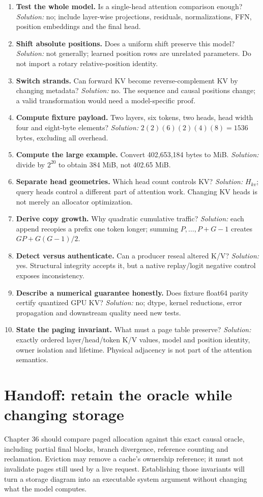 \begin{enumerate}
\emph{Solution:} each of the five internal gaps independently contains a
chunk boundary or not.
\item \textbf{Test the whole model.} Is a single-head attention comparison
enough? \emph{Solution:} no; include layer-wise projections, residuals,
normalizations, FFN, position embeddings and the final head.
\item \textbf{Shift absolute positions.} Does a uniform shift preserve this
model? \emph{Solution:} not generally; learned position rows are unrelated
parameters. Do not import a rotary relative-position identity.
\item \textbf{Switch strands.} Can forward KV become reverse-complement KV
by changing metadata? \emph{Solution:} no. The sequence and causal positions
change; a valid transformation would need a model-specific proof.
\item \textbf{Compute fixture payload.} Two layers, six tokens, two heads,
head width four and eight-byte elements? \emph{Solution:}
$2(2)(6)(2)(4)(8)=1536$ bytes, excluding all overhead.
\item \textbf{Compute the large example.} Convert 402,653,184 bytes to MiB.
\emph{Solution:} divide by $2^{20}$ to obtain 384 MiB, not 402.65 MiB.
\item \textbf{Separate head geometries.} Which head count controls KV?
\emph{Solution:} $H_{kv}$; query heads control a different part of attention
work. Changing KV heads is not merely an allocator optimization.
\item \textbf{Derive copy growth.} Why quadratic cumulative traffic?
\emph{Solution:} each append recopies a prefix one token longer; summing
$P,\ldots,P+G-1$ creates $GP+G(G-1)/2$.
\item \textbf{Detect versus authenticate.} Can a producer reseal altered
K/V? \emph{Solution:} yes. Structural integrity accepts it, but a native
replay/logit negative control exposes inconsistency.
\item \textbf{Describe a numerical guarantee honestly.} Does fixture
float64 parity certify quantized GPU KV? \emph{Solution:} no; dtype,
kernel reductions, error propagation and downstream quality need new tests.
\item \textbf{State the paging invariant.} What must a page table preserve?
\emph{Solution:} exactly ordered layer/head/token K/V values, model and
position identity, owner isolation and lifetime. Physical adjacency is not
part of the attention semantics.
\end{enumerate}

\section{Handoff: retain the oracle while changing storage}
Chapter 36 should compare paged allocation against this exact causal oracle,
including partial final blocks, branch divergence, reference counting and
reclamation. Eviction may remove a cache's ownership reference; it must not
invalidate pages still used by a live request. Establishing those invariants
will turn a storage diagram into an executable system argument without
changing what the model computes.
